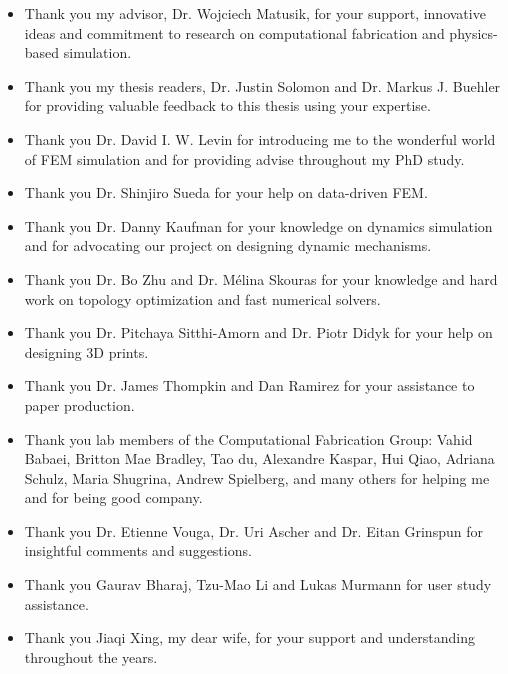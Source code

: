 \begin{itemize}
\item[]
Thank you my advisor, Dr. Wojciech Matusik, for your support, innovative ideas and commitment to research on computational fabrication and physics-based simulation.
\item[]
Thank you my thesis readers, Dr. Justin Solomon and Dr. Markus J. Buehler for providing valuable feedback to this thesis using your expertise.
\item[]
Thank you Dr. David I. W. Levin for introducing me to the wonderful world of FEM simulation and for providing advise throughout my PhD study.
\item[]
Thank you Dr. Shinjiro Sueda for your help on data-driven FEM.
\item[]
Thank you Dr. Danny Kaufman for your knowledge on dynamics simulation and for advocating our project on designing dynamic mechanisms.
\item[]
Thank you Dr. Bo Zhu and Dr. M\'{e}lina Skouras for your knowledge and hard work on topology optimization and fast numerical solvers.
\item[]
Thank you Dr. Pitchaya Sitthi-Amorn and Dr. Piotr Didyk for your help on designing 3D prints.
\item[]
Thank you Dr. James Thompkin and Dan Ramirez for your assistance to paper production.
\item[]
Thank you lab members of the Computational Fabrication Group: Vahid Babaei, Britton Mae Bradley, Tao du, Alexandre Kaspar, Hui Qiao, Adriana 
Schulz, Maria Shugrina, Andrew Spielberg, and many others for helping me and for being good company.
\item[]
Thank you Dr. Etienne Vouga, Dr. Uri Ascher and Dr. Eitan Grinspun for insightful comments and suggestions.
\item[]
Thank you Gaurav Bharaj, Tzu-Mao Li and Lukas Murmann for user study assistance.
\item[]
Thank you Jiaqi Xing, my dear wife, for your support and understanding throughout the years.
\end{itemize}
